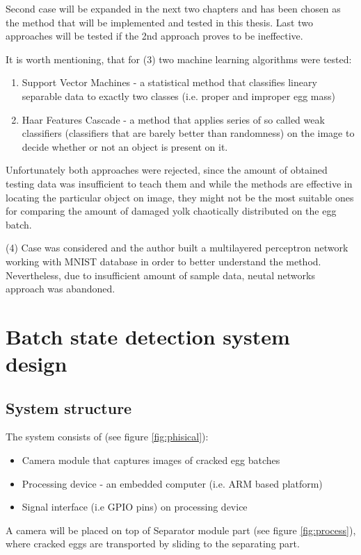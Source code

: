 \documentclass[12pt,twoside,a4paper]{article}
\begin{document}
Second case will be expanded in the next two chapters and has been chosen as the method that will be implemented and tested in this thesis.
Last two approaches will be tested if the 2nd approach proves to be ineffective.

It is worth mentioning, that for (3) two machine learning algorithms were tested: 
\begin{enumerate}
\item Support Vector Machines - a statistical method that classifies lineary separable data to exactly two classes (i.e. proper and improper egg mass) 
\item Haar Features Cascade - a method that applies series of so called weak classifiers (classifiers that are barely better than randomness) on the image to decide whether or not an object is present on it.
\end{enumerate}
Unfortunately both approaches were rejected, since the amount of obtained testing data was insufficient to teach them and while the methods are effective in locating the particular object on image, they might not be the most suitable ones for comparing the amount of damaged yolk chaotically distributed on the egg batch.

(4) Case was considered and the author built a multilayered perceptron network working with MNIST database in order to better understand the method.
Nevertheless, due to insufficient amount of sample data, neutal networks approach was abandoned.


\section{Batch state detection system design}

\subsection{System structure}
The system consists of (see figure \ref{fig:phisical}):
\begin{itemize}
\item Camera module that captures images of cracked egg batches
\item Processing device - an embedded computer (i.e. ARM based platform)
\item Signal interface (i.e GPIO pins) on processing device
\end{itemize}

A camera will be placed on top of Separator module part (see figure \ref{fig:process}), where cracked eggs are transported by sliding to the separating part.
\end{document}
